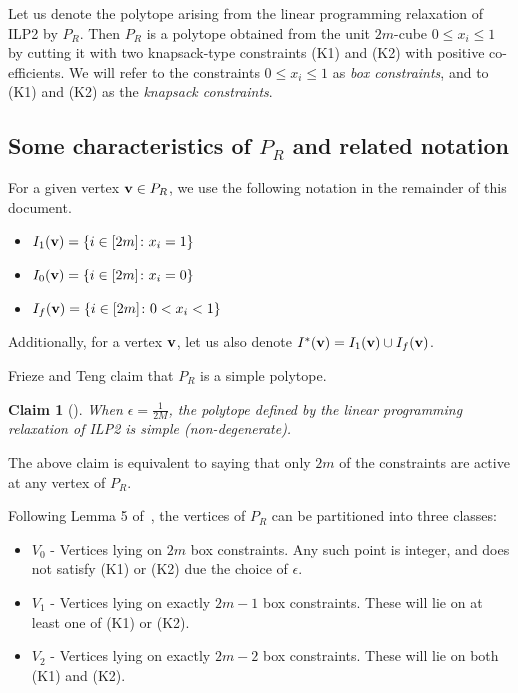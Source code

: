 \documentclass[3p, twocolumn]{elsarticle}
\newtheorem{claim}[theorem]{Claim}
\def\ve#1{\mathchoice{\mbox{\boldmath$\displaystyle\bf#1$}}
{\mbox{\boldmath$\textstyle\bf#1$}}
{\mbox{\boldmath$\scriptstyle\bf#1$}}
{\mbox{\boldmath$\scriptscriptstyle\bf#1$}}}
\begin{document}
Let us denote the polytope arising from the linear programming relaxation of ILP2 by $P_R$. Then $P_R$ is a polytope obtained from the unit $2m$-cube $0 \le x_i \le 1$ by cutting it with two knapsack-type constraints (K1) and (K2) with positive co-efficients. We will refer to the constraints $0 \le x_i \le 1$ as \textit{box constraints}, and to (K1) and (K2) as the \textit{knapsack constraints}.

\subsection{Some characteristics of $P_R$ and related notation}\label{vertex}
For a given vertex $\ve{v} \in P_R$, we use the following notation in the remainder of this document.
\begin{itemize}
    \item $I_1(\ve{v}) = \{i \in [2m] \colon x_i=1\}$
    \item $I_0(\ve{v}) = \{i \in [2m] \colon x_i=0\} $
    \item $I_f(\ve{v}) = \{i \in [2m] \colon 0<x_i<1\} $
\end{itemize}
Additionally, for a vertex $\ve{v}$, let us also denote $I^*(\ve{v}) = I_1(\ve{v}) \cup I_f(\ve{v})$.

Frieze and Teng claim that $P_R$ is a simple polytope. 

\begin{claim}[\cite{FT94}]\label{nondegLPre}
    When \(\epsilon = \frac{1}{2M}\), the polytope defined by the linear programming relaxation of ILP2 is simple (non-degenerate).
\end{claim}
The above claim is equivalent to saying that only $2m$ of the constraints are active at any vertex of $P_R$. 

Following Lemma 5 of~\cite{FT94}, the vertices of $P_R$ can be partitioned into three classes:
\begin{itemize}
    \item[] $V_0$ - Vertices lying on $2m$ box constraints. Any such point is integer, and does not satisfy (K1) or (K2) due the choice of $\epsilon$. 
    \item[] $V_1$ - Vertices lying on exactly $2m-1$ box constraints.  These will lie on at least one of (K1) or (K2). 
    \item[] $V_2$ - Vertices lying on exactly $2m-2$ box constraints.  These will lie on both (K1) and (K2).
\end{itemize}
\end{document}
